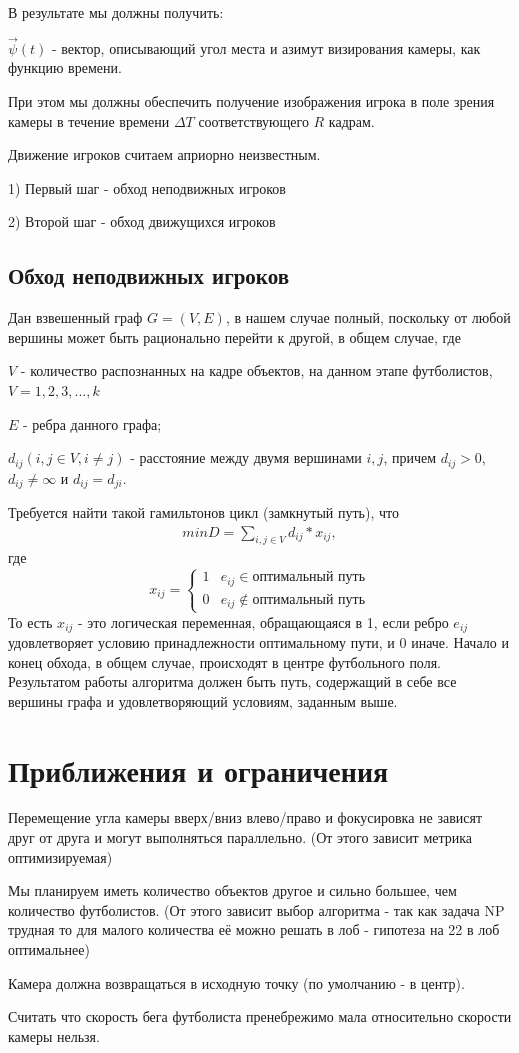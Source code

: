 В результате мы должны получить:

$\vec \psi(t)$ - вектор, описывающий угол места и азимут визирования камеры, как функцию времени. 

При этом мы должны обеспечить получение изображения игрока в поле зрения камеры в течение времени $\Delta T$ соответствующего $R$ кадрам. 

Движение игроков считаем априорно неизвестным. 

1) Первый шаг - обход неподвижных игроков

2) Второй шаг - обход движущихся игроков 

\subsection{Обход неподвижных игроков}

Дан взвешенный граф $G = (V, E)$, в нашем случае полный, поскольку от любой вершины может быть рационально перейти к другой, в общем случае, где

$V$ - количество распознанных на кадре объектов, на данном этапе футболистов, $V = {1, 2, 3, ..., k}$

$E$ - ребра данного графа; 

$d_{ij}(i, j \in V, i \neq j)$ - расстояние между двумя вершинами $i, j$, причем $d_{ij} > 0$,  $d_{ij} \neq \infty$ и $d_{ij} = d_{ji}$.

Требуется найти такой гамильтонов цикл (замкнутый путь), что 
\begin{align}
    minD  = \sum_{i,j \in V} d_{ij} * x_{ij},
\end{align}
где 
\begin{equation}
    x_{ij} = 
    \begin{cases}
        1 & e_{ij} \in \text{оптимальный путь}\\
        0 & e_{ij} \notin \text{оптимальный путь}
    \end{cases}
\end{equation}
То есть $x_{ij}$ - это логическая переменная, обращающаяся в 1, если ребро $e_{ij}$ удовлетворяет условию принадлежности оптимальному пути, и 0 иначе. Начало и конец обхода, в общем случае, происходят в центре футбольного поля. Результатом работы алгоритма должен быть путь, содержащий в себе все вершины графа и удовлетворяющий условиям, заданным выше.

\section{Приближения и ограничения}
 
Перемещение угла камеры вверх/вниз влево/право и фокусировка не зависят друг от друга и могут выполняться параллельно. (От этого зависит метрика оптимизируемая)

 
Мы планируем иметь количество объектов другое и сильно большее, чем количество футболистов. (От этого зависит выбор алгоритма - так как задача NP трудная то для малого количества её можно решать в лоб - гипотеза на 22 в лоб оптимальнее)

Камера должна возвращаться в исходную точку (по умолчанию - в центр). 

 
Считать что скорость бега футболиста пренебрежимо мала относительно скорости камеры нельзя.  
